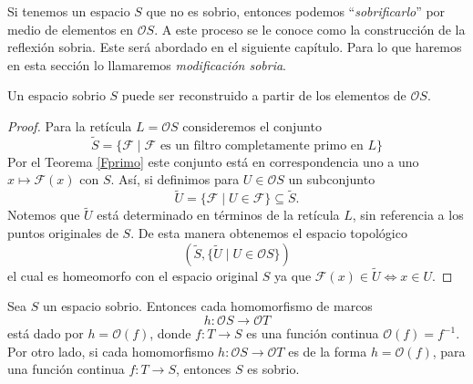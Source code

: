 \documentclass{comunicaciones}
\begin{document}
Si tenemos un espacio $S$ que no es sobrio, entonces podemos ``\emph{sobrificarlo}'' por medio de elementos en $\mathcal{O}S$. A este proceso se le conoce como la construcción de la reflexión sobria. Este será abordado en el siguiente capítulo. Para lo que haremos en esta sección lo llamaremos \emph{modificación sobria}.

\begin{cor}\label{Modsobria}
    Un espacio sobrio $S$ puede ser reconstruido a partir de los elementos de $\mathcal{O}S$.  
\end{cor}

\begin{proof}
    Para la retícula $L=\mathcal{O}S$ consideremos el conjunto 
    \[
    \tilde{S}=\{\mathcal{F}\mid \mathcal{F}\mbox{ es un filtro completamente primo en }L\}
    \]
    Por el Teorema \ref{Fprimo} este conjunto está en correspondencia uno a uno $x\mapsto \mathcal{F}(x)$ con $S$. Así, si definimos para $U\in \mathcal{O}S$ un subconjunto 
    \[
    \tilde{U}=\{\mathcal{F}\mid U\in\mathcal{F}\}\subseteq \tilde{S}.
    \]
    Notemos que $\tilde{U}$ está determinado en términos de la retícula $L$, sin referencia a los puntos originales de $S$. De esta manera obtenemos el espacio topológico 
    \[
    (\tilde{S},\{\tilde{U}\mid U\in\mathcal{O}S\})
    \]
    el cual es homeomorfo con el espacio original $S$ ya que $\mathcal{F}(x)\in \tilde{U}\Leftrightarrow x\in U$.
\end{proof}

\begin{thm}
    Sea $S$ un espacio sobrio. Entonces cada homomorfismo de marcos 
    \[
    h\colon \mathcal{O}S\to \mathcal{O}T
    \]
    está dado por $h=\mathcal{O}(f)$, donde $f\colon T\to S$ es una función continua $\mathcal{O}(f)=f^{-1}$. Por otro lado, si cada homomorfismo $h\colon \mathcal{O}S\to \mathcal{O}T$ es de la forma $h=\mathcal{O}(f)$, para una función  continua $f\colon T\to S$, entonces $S$ es sobrio.
\end{thm}
\end{document}
